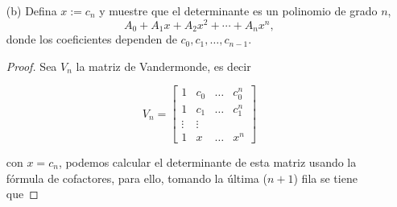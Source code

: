 \documentclass[11pt]{article}
\theoremstyle{definition} %
\begin{document}
\begin{enumerate}
\begin{proof}
\[\begin{bmatrix}
1 & c_0 & c_0^2 \\

0 & 1 & c_1 + c_0 \\

0 & 1 & c_2 + c_0

\end{bmatrix}.
\]

Restando la segunda fila de la tercera para triangularizar completamente

\[
\det(V_2) = (c_1 - c_0)(c_2 - c_0) \det
\begin{bmatrix}

1 & c_0 & c_0^2 \\

0 & 1 & c_1 + c_0 \\

0 & 0 & c_2 - c_1

\end{bmatrix} = (c_1 - c_0)(c_2 - c_0)(c_2 - c_1),
\]

lo que coincide con la fórmula original

\[
\prod_{0 \le j < k \le 2} (c_k - c_j) = (c_1 - c_0)(c_2 - c_0)(c_2 - c_1).
\]

  \end{proof}
  \item[(b)] Defina \(x:=c_n\) y muestre que el determinante es un polinomio de grado \(n\),
  \[
    A_0 + A_1 x + A_2 x^2 + \cdots + A_n x^n,
  \]
  donde los coeficientes dependen de \(c_0,c_1,\dots,c_{n-1}\).
  \begin{proof}
    Sea $V_n$ la matriz de Vandermonde, es decir

\[
V_n = \begin{bmatrix}

    1 & c_0 & \dots & c_0^n \\

    1 & c_1 & \dots & c_1^n \\

    \vdots & \vdots \\

    1 & x & \dots & x^n

\end{bmatrix}
\]

con $x = c_n$, podemos calcular el determinante de esta matriz usando la fórmula de cofactores, para ello, tomando la última ($n+1$) fila se tiene que


\end{proof}
\end{enumerate}
\end{document}
